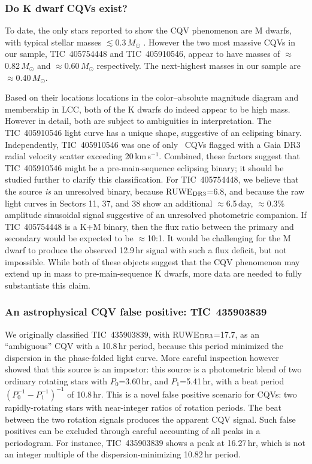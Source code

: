 \documentclass[11pt,twocolumn,tighten]{aastex63}
\newcommand{\kms}{{km\,s$^{-1}$}}
\begin{document}
\subsubsection{Do K dwarf CQVs exist?}
\label{subsec:massive}

To date, the only stars reported to show the CQV phenomenon are M
dwarfs, with typical stellar masses $\lesssim$0.3\,$M_\odot$
\citep{2017AJ....153..152S,2022AJ....163..144G}.  However the two most
massive CQVs in our sample, TIC~405754448 and TIC~405910546, appear to
have masses of $\approx$0.82\,$M_\odot$ and $\approx$0.60\,$M_\odot$
respectively.  The next-highest masses in our sample are
$\approx$0.40\,$M_\odot$.

Based on their locations locations in the color--absolute magnitude
diagram and membership in LCC, both of the K dwarfs do indeed appear
to be high mass.  However in detail, both are subject to ambiguities
in interpretation.  The TIC~405910546 light curve has a unique shape,
suggestive of an eclipsing binary.  Independently, TIC~405910546 was
one of only \nrvscatterflag\ CQVs flagged with a Gaia DR3 radial
velocity scatter exceeding 20\,\kms.  Combined, these factors suggest
that TIC~405910546 might be a pre-main-sequence eclipsing binary; it
should be studied further to clarify this classification.  For
TIC~405754448, we believe that the source {\it is} an unresolved
binary, because RUWE$_{\rm DR3}$=6.8, and because the raw light curves
in Sectors 11, 37, and 38 show an additional $\approx$6.5\,day,
$\approx$0.3\% amplitude sinusoidal signal suggestive of an unresolved
photometric companion.  If TIC~405754448 is a K+M binary, then the
flux ratio between the primary and secondary would be expected to be
$\approx$10:1.  It would be challenging for the M dwarf to produce the
observed 12.9\,hr signal with such a flux deficit, but not impossible.
While both of these objects suggest that the CQV phenomenon may extend
up in mass to pre-main-sequence K dwarfs, more data are needed to
fully substantiate this claim.

\subsubsection{An astrophysical CQV false positive: TIC~435903839}

We originally classified TIC~435903839, with RUWE$_{\rm DR3}$=17.7, as
an ``ambiguous'' CQV with a 10.8\,hr period, because this period
minimized the dispersion in the phase-folded light curve.  More
careful inspection however showed that this source is an impostor:
this source is a photometric blend of two ordinary rotating stars with
$P_0$=3.60\,hr, and $P_1$=5.41\,hr, with a beat period $(P_0^{-1} -
P_1^{-1})^{-1}$ of 10.8\,hr.  This is a novel false positive scenario
for CQVs: two rapidly-rotating stars with near-integer ratios of
rotation periods.  The beat between the two rotation signals produces
the apparent CQV signal.  Such false positives can be excluded through
careful accounting of all peaks in a periodogram.  For instance,
TIC~435903839 shows a peak at 16.27\,hr, which is not an integer
multiple of the dispersion-minimizing 10.82\,hr period.
\end{document}
